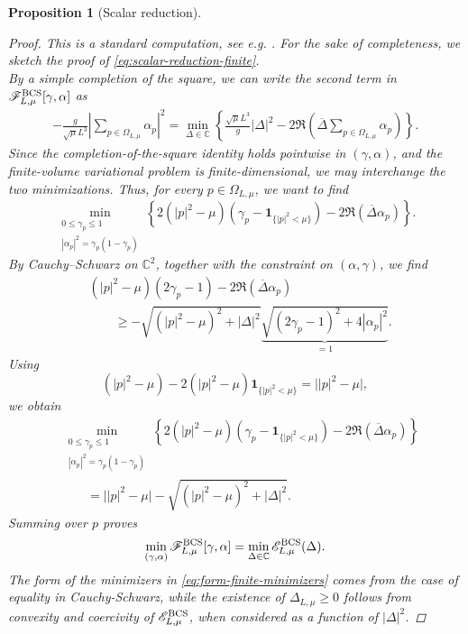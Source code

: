 \documentclass[11pt]{amsart}
\newtheorem{proposition}[definition]{Proposition}
\theoremstyle{definition}
\numberwithin{equation}{section}
\newcommand{\C}{\mathbb C}
\newcommand{\1}{\mathbf 1}
\begin{document}
\begin{proposition}[Scalar reduction]
\begin{proof}
  This is a standard computation, see e.g. \cite{martin2013many}. For the sake of completeness, we sketch the proof of \eqref{eq:scalar-reduction-finite}.\\
  By a simple completion of the square, we can write the second term in $\mathscr{F}^{\rm BCS}_{L, \mu}[\gamma, \alpha]$ as
\begin{align*}
-\frac{g}{\sqrt\mu L^3}
\left|\sum_{p\in\Omega_{L,\mu}}\alpha_p\right|^2
=
\min_{\Delta\in\C}
\left\{
\frac{\sqrt\mu L^3}{g}|\Delta|^2
-2\Re\left(
\overline{\Delta}
\sum_{p\in\Omega_{L,\mu}}\alpha_p
\right)
\right\}.
\end{align*}
Since the completion-of-the-square identity holds pointwise in \((\gamma,\alpha)\), and the finite-volume variational problem is finite-dimensional, we may interchange the two minimizations.
 Thus, for every
$p\in\Omega_{L,\mu}$, we want to find
\[
\min_{\substack{0\leq\gamma_p\leq1\\
|\alpha_p|^2=\gamma_p(1-\gamma_p)}}
\left\{
2(|p|^2-\mu)
\left(\gamma_p-\1_{\{|p|^2<\mu\}}\right)
-2\Re(\overline{\Delta}\alpha_p)
\right\}.
\]
By Cauchy--Schwarz on $\C^2$, together with the constraint on $(\alpha, \gamma)$, we find
\begin{align*}
&(|p|^2-\mu)(2\gamma_p-1)
-2\Re(\overline{\Delta}\alpha_p)
\\
&\qquad\geq
-\sqrt{(|p|^2-\mu)^2+|\Delta|^2} \underbrace{\sqrt{(2\gamma_p -1)^2 + 4|\alpha_p|^2}}_{= 1}.
\end{align*}
Using
\[
(|p|^2-\mu)
-2(|p|^2-\mu)\1_{\{|p|^2<\mu\}}
=
\bigl||p|^2-\mu\bigr|,
\]
we obtain
\begin{align*}
&\min_{\substack{0\leq\gamma_p\leq1\\
|\alpha_p|^2=\gamma_p(1-\gamma_p)}}
\left\{
2(|p|^2-\mu)
\left(\gamma_p-\1_{\{|p|^2<\mu\}}\right)
-2\Re(\overline{\Delta}\alpha_p)
\right\}
\\
&\qquad=
\bigl||p|^2-\mu\bigr|
-\sqrt{(|p|^2-\mu)^2+|\Delta|^2}.
\end{align*}
Summing over $p$ proves
\[
\min_{(\gamma,\alpha)}
\mathscr F^{\rm BCS}_{L,\mu}[\gamma,\alpha]
=
\min_{\Delta\in\C}
\mathscr E^{\rm BCS}_{L,\mu}(\Delta).
\]
The form of the minimizers in \eqref{eq:form-finite-minimizers} comes from the case of equality in Cauchy-Schwarz, while the existence of $\Delta_{L, \mu} \geq 0$ follows from convexity and coercivity of $\mathscr{E}^{\rm BCS}_{L, \mu}$, when considered as a function of $|\Delta|^2$.
\end{proof}
\end{proposition}
\end{document}

